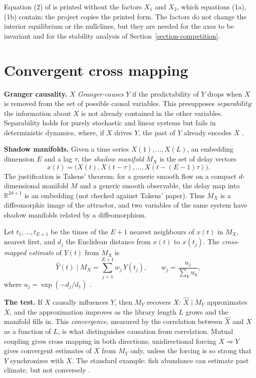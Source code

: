 \begin{remark}
\label{remark-armstrong-misprint}
Equation (2) of
\cite{armstrong1976fugitive} is printed
without the factors $X_1$ and $X_2$, which
equations (1a), (1b) contain; the
project copies the printed form. The factors
do not change the interior equilibrium or
the nullclines, but they are needed for the
axes to be invariant and for the stability
analysis of
Section~\ref{section-competition}.
\end{remark}

\section{Convergent cross mapping}
\label{section-ccm}

\textbf{Granger causality.}
$X$ \emph{Granger-causes} $Y$ if the
predictability of $Y$ drops when $X$ is
removed from the set of possible causal
variables. This presupposes
\emph{separability}: the information about
$X$ is not already contained in the other
variables. Separability holds for purely
stochastic and linear systems but fails in
deterministic dynamics, where, if $X$
drives $Y$, the past of $Y$ already encodes
$X$ \cite{sugihara2012detecting}.

\textbf{Shadow manifolds.}
Given a time series $X(1),\ldots,X(L)$, an
embedding dimension $E$ and a lag $\tau$,
the \emph{shadow manifold} $M_X$ is the set
of delay vectors
$$
x(t) = \bigl(X(t), X(t-\tau), \ldots,
X(t-(E-1)\tau)\bigr).
$$
The justification is Takens' theorem: for
a generic smooth flow on a compact
$d$-dimensional manifold $M$ and a generic
smooth observable, the delay map into
$\mathbb{R}^{2d+1}$ is an embedding (not
checked against Takens' paper). Thus $M_X$
is a diffeomorphic image of the attractor,
and two variables of the same system have
shadow manifolds related by a
diffeomorphism.

\begin{definition}
\label{definition-cross-map}
Let $t_1,\ldots,t_{E+1}$ be the times of
the $E+1$ nearest neighbours of $x(t)$ in
$M_X$, nearest first, and $d_j$ the
Euclidean distance from $x(t)$ to
$x(t_j)$. The \emph{cross-mapped estimate}
of $Y(t)$ from $M_X$ is
$$
\hat Y(t)\mid M_X =
\sum_{j=1}^{E+1} w_j\, Y(t_j),
\qquad
w_j = \frac{u_j}{\sum_k u_k},
$$
where $u_j = \exp(-d_j/d_1)$
\cite{sugihara2012detecting}.
\end{definition}

\textbf{The test.}
If $X$ causally influences $Y$, then $M_Y$
recovers $X$: $\hat X\mid M_Y$ approximates
$X$, and the approximation improves as the
library length $L$ grows and the manifold
fills in. This \emph{convergence}, measured
by the correlation between $\hat X$ and $X$
as a function of $L$, is what distinguishes
causation from correlation. Mutual coupling
gives cross mapping in both directions;
unidirectional forcing $X\Rightarrow Y$
gives convergent estimates of $X$ from
$M_Y$ only, unless the forcing is so strong
that $Y$ synchronizes with $X$. The
standard example: fish abundance can
estimate past climate, but not conversely
\cite{sugihara2012detecting}.

